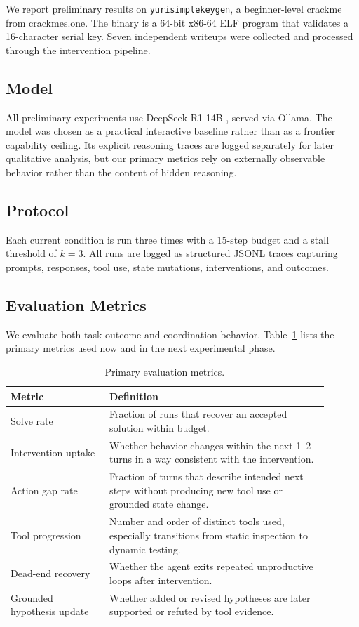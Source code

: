 \documentclass[letterpaper]{article}
\begin{document}
We report preliminary results on \texttt{yurisimplekeygen}, a beginner-level crackme from crackmes.one.
The binary is a 64-bit x86-64 ELF program that validates a 16-character serial key.
Seven independent writeups were collected and processed through the intervention pipeline.

\subsection{Model}

All preliminary experiments use DeepSeek R1 14B \citep{deepseekai2025deepseekr1}, served via Ollama.
The model was chosen as a practical interactive baseline rather than as a frontier capability ceiling.
Its explicit reasoning traces are logged separately for later qualitative analysis, but our primary metrics rely on externally observable behavior rather than the content of hidden reasoning.

\subsection{Protocol}

Each current condition is run three times with a 15-step budget and a stall threshold of $k=3$.
All runs are logged as structured JSONL traces capturing prompts, responses, tool use, state mutations, interventions, and outcomes.

\subsection{Evaluation Metrics}

We evaluate both task outcome and coordination behavior.
Table~\ref{tab:metrics} lists the primary metrics used now and in the next experimental phase.

\begin{table}[t]
\centering
\caption{Primary evaluation metrics.}
\label{tab:metrics}
\begin{tabular}{p{0.28\linewidth}p{0.62\linewidth}}
\toprule
Metric & Definition \\
\midrule
Solve rate & Fraction of runs that recover an accepted solution within budget. \\
Intervention uptake & Whether behavior changes within the next 1--2 turns in a way consistent with the intervention. \\
Action gap rate & Fraction of turns that describe intended next steps without producing new tool use or grounded state change. \\
Tool progression & Number and order of distinct tools used, especially transitions from static inspection to dynamic testing. \\
Dead-end recovery & Whether the agent exits repeated unproductive loops after intervention. \\
Grounded hypothesis update & Whether added or revised hypotheses are later supported or refuted by tool evidence. \\
\bottomrule
\end{tabular}
\end{table}
\end{document}
